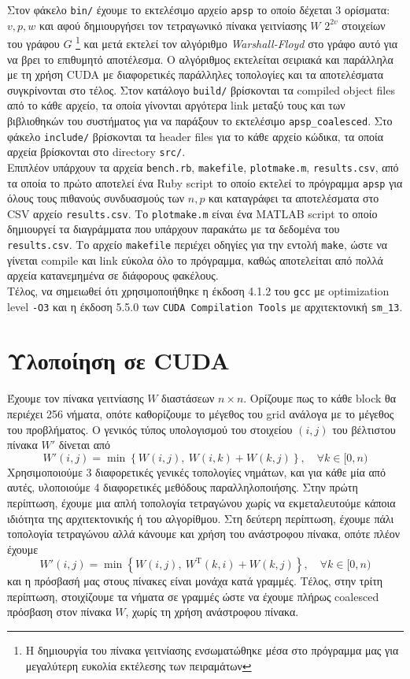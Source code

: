 \documentclass[11pt,a4paper,titlepage]{article}
\begin{document}
	Στον φάκελο \verb|bin/| έχουμε το εκτελέσιμο αρχείο \verb|apsp| το οποίο δέχεται 3 ορίσματα: $v, p, w$ και αφού δημιουργήσει τον τετραγωνικό πίνακα γειτνίασης $W$ $2^{2v}$ στοιχείων του γράφου $G$ \footnote{Η δημιουργία του πίνακα γειτνίασης ενσωματώθηκε μέσα στο πρόγραμμα μας για μεγαλύτερη ευκολία εκτέλεσης των πειραμάτων} και μετά εκτελεί τον αλγόριθμο \textit{Warshall-Floyd} στο γράφο αυτό για να βρει το επιθυμητό αποτέλεσμα. Ο αλγόριθμος εκτελείται σειριακά και παράλληλα με τη χρήση CUDA με διαφορετικές παράλληλες τοπολογίες και τα αποτελέσματα συγκρίνονται στο τέλος. Στον κατάλογο  \verb|build/| βρίσκονται τα compiled object files από το κάθε αρχείο, τα οποία γίνονται αργότερα link μεταξύ τους και των βιβλιοθηκών του συστήματος για να παράξουν το εκτελέσιμο \verb|apsp_coalesced|. Στο φάκελο \verb|include/| βρίσκονται τα header files για το κάθε αρχείο κώδικα,  τα οποία αρχεία βρίσκονται στο directory \verb|src/|.\\

	Επιπλέον υπάρχουν τα αρχεία \verb|bench.rb|, \verb|makefile|, \verb|plotmake.m|, \verb|results.csv|, από τα οποία το πρώτο αποτελεί ένα Ruby script το οποίο εκτελεί το πρόγραμμα \verb|apsp| για όλους τους πιθανούς συνδυασμούς των $n, p$ και καταγράφει τα αποτελέσματα στο CSV αρχείο \verb|results.csv|. Το \verb|plotmake.m| είναι ένα MATLAB script το οποίο δημιουργεί τα διαγράμματα που υπάρχουν παρακάτω με τα δεδομένα του \verb|results.csv|. Το αρχείο \verb|makefile| περιέχει οδηγίες για την εντολή \verb|make|, ώστε να γίνεται compile και link εύκολα όλο το πρόγραμμα, καθώς αποτελείται από πολλά αρχεία κατανεμημένα σε διάφορους φακέλους.\\

	Τέλος, να σημειωθεί ότι χρησιμοποιήθηκε η έκδοση 4.1.2 του \verb|gcc| με optimization level \verb|-O3| και η έκδοση 5.5.0 των \verb|CUDA Compilation Tools| με αρχιτεκτονική \verb|sm_13|.

\section{Υλοποίηση σε CUDA}
	Έχουμε τον πίνακα γειτνίασης $W$ διαστάσεων $n\times n$. Ορίζουμε πως το κάθε block θα περιέχει 256 νήματα, οπότε  καθορίζουμε το μέγεθος του grid ανάλογα με το μέγεθος του προβλήματος. Ο γενικός τύπος υπολογισμού του στοιχείου $(i, j)$ του βέλτιστου πίνακα $W'$ δίνεται από
	$$
		W'(i, j) = \min\left\{W(i, j),\ W(i,k) + W(k,j)\right\},\quad \forall k \in [0, n)
	$$
	Χρησιμοποιούμε 3 διαφορετικές γενικές τοπολογίες νημάτων, και για κάθε μία από αυτές, υλοποιούμε 4 διαφορετικές μεθόδους παραλληλοποιήσης. Στην πρώτη περίπτωση, έχουμε μια απλή τοπολογία τετραγώνου χωρίς να εκμεταλευτούμε κάποια ιδιότητα της αρχιτεκτονικής ή του αλγορίθμου. Στη δεύτερη περίπτωση, έχουμε πάλι τοπολογία τετραγώνου αλλά κάνουμε και χρήση του ανάστροφου πίνακα, οπότε πλέον έχουμε
	$$
		W'(i, j) = \min\left\{W(i, j),\ W^{\mathrm{T}}(k,i) + W(k,j)\right\},\quad \forall k \in [0, n)
	$$
	και η πρόσβασή μας στους πίνακες είναι μονάχα κατά γραμμές. Τέλος, στην τρίτη περίπτωση, στοιχίζουμε τα νήματα σε γραμμές ώστε να έχουμε πλήρως coalesced πρόσβαση στον πίνακα $W$, χωρίς τη χρήση ανάστροφου πίνακα.
\end{document}
